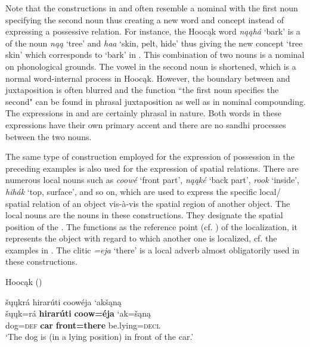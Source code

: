 \documentclass[output=paper]{LSP/langsci}
\begin{document}
Note that the constructions in  and  often resemble a nominal  with the first noun specifying the second noun thus creating a new word and concept instead of expressing a possessive relation. For instance, the Hoocąk word \textit{n\k{a}\k{a}h\'a} `bark' is a  of the noun \textit{n\k{a}\k{a}} `tree' and \textit{haa} `skin, pelt, hide' thus giving the new concept `tree skin' which corresponds to `bark' in . This combination of two nouns is a nominal  on phonological grounds. The vowel in the second noun is shortened, which is a normal word-internal process in Hoocąk. However, the boundary between  and juxtaposition is often blurred and the function ``the first noun specifies the second" can be found in phrasal juxtaposition as well as in nominal compounding. The expressions in  and  are certainly phrasal in nature. Both words in these expressions have their own primary accent and there are no sandhi processes between the two nouns. 

The same type of construction employed for the expression of possession in the preceding examples is also used for the expression of spatial relations. There are numerous local nouns such as \textit{coow\'e}  `front part', \textit{n\k{a}\k{a}k\'e} `back part', \textit{rook} `inside', \textit{hihák} `top, surface', and so on, which are used to express the specific local/ spatial relation of an object vis-à-vis the spatial region of another object. The local nouns are the  nouns in these constructions. They designate the spatial position of the . The  functions as the reference point (cf. \citealt{Langacker1993}) of the localization, it represents the object with regard to which another one is localized, cf. the examples in . The clitic \textit{=eja} `there' is a local adverb almost obligatorily used in these constructions. 
 
\ea {}Hoocąk (\citealt[14]{Helmbrecht2003}) \label{dogposition}

\ea 
\glll \v{s}\k{u}\k{u}kr\'a hirar\'uti  coow\'eja `ak\v{s}\k{a}n\k{a}  \\
\v{s}\k{u}\k{u}k=r\'a \textbf{hirar\'uti}  \textbf{coow=\'eja} `ak=\v{s}\k{a}n\k{a} \\ 
dog=\textsc{def} \textbf{car} \textbf{front=there} be.lying=\textsc{decl} \\
\glt `The dog is (in a lying position) in front of the car.'
\end{document}

